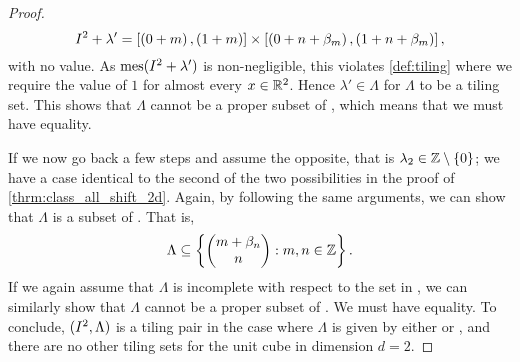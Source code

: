 \documentclass[../thesis.tex]{subfiles}
\begin{document}
\begin{proof}
    \begin{equation*}
        I^2 + \lambda' = \left[\left(0+m\right),\left(1+m\right)\right]\times \left[\left(0+n+\beta_m\right),\left(1+n+\beta_m\right)\right], 
    \end{equation*}
    with no value. As $\operatorname{mes}(I^2 + \lambda')$ is non-negligible, this violates \cref{def:tiling} where we require the value of $1$ for almost every $x\in \mathbb{R}^2$. Hence $\lambda'\in \Lambda$ for $\Lambda$ to be a tiling set. This shows that $\Lambda$ cannot be a proper subset of , which means that we must have equality.%
    
    If we now go back a few steps and assume the opposite, that is $\lambda_2 \in \mathbb{Z}\setminus\{0\}$; we have a case identical to the second of the two possibilities in the proof of \cref{thrm:class_all_shift_2d}. Again, by following the same arguments, we can show that $\Lambda$ is a subset of . That is,
    \begin{equation*}  %
        \Lambda \subseteq \braqMed{\begin{pmatrix} m +\beta_n \\ n\end{pmatrix} : m,n \in \Z}.
    \end{equation*}
    If we again assume that $\Lambda$ is incomplete with respect to the set in , we can similarly show that $\Lambda$ cannot be a proper subset of . We must have equality. To conclude, $(I^2, \Lambda)$ is a tiling pair in the case where $\Lambda$ is given by either  or , and there are no other tiling sets for the unit cube in dimension $d=2$.
\end{proof}
\end{document}
